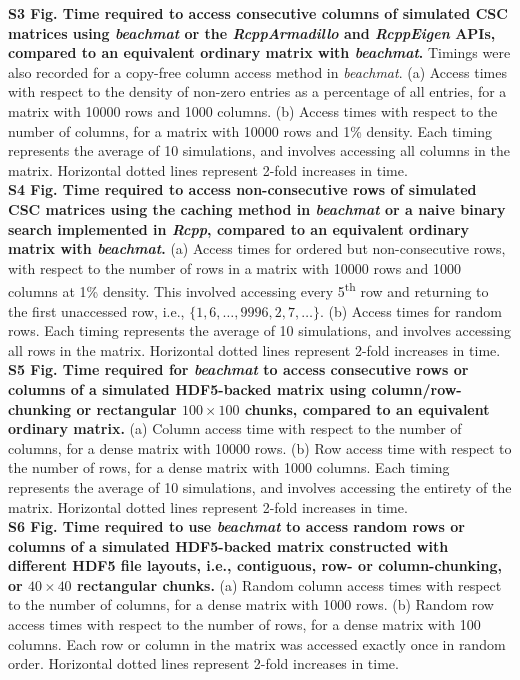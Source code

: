 \documentclass[10pt,letterpaper]{article}
\newcommand{\beachmat}{\textit{beachmat}}
\begin{document}
\noindent
\textbf{S3 Fig. Time required to access consecutive columns of simulated CSC matrices using \beachmat{} or the \textit{RcppArmadillo} and \textit{RcppEigen} APIs, compared to an equivalent ordinary matrix with \beachmat{}.}
Timings were also recorded for a copy-free column access method in \beachmat{}.
(a) Access times with respect to the density of non-zero entries as a percentage of all entries, for a matrix with 10000 rows and 1000 columns.
(b) Access times with respect to the number of columns, for a matrix with 10000 rows and 1\% density.
Each timing represents the average of 10 simulations, and involves accessing all columns in the matrix.
Horizontal dotted lines represent 2-fold increases in time.
\\[0.05in]

\noindent
\textbf{S4 Fig. Time required to access non-consecutive rows of simulated CSC matrices using the caching method in \beachmat{} or a naive binary search implemented in \textit{Rcpp}, compared to an equivalent ordinary matrix with \beachmat{}.}
(a) Access times for ordered but non-consecutive rows, with respect to the number of rows in a matrix with 10000 rows and 1000 columns at 1\% density.
This involved accessing every 5\textsuperscript{th} row and returning to the first unaccessed row, i.e., $\{1, 6, \ldots, 9996, 2, 7, \ldots\}$.
(b) Access times for random rows.
Each timing represents the average of 10 simulations, and involves accessing all rows in the matrix.
Horizontal dotted lines represent 2-fold increases in time.
\\[0.05in]

\noindent
\textbf{S5 Fig. Time required for \beachmat{} to access consecutive rows or columns of a simulated HDF5-backed matrix using column/row-chunking or rectangular $100\times100$ chunks, compared to an equivalent ordinary matrix.}
(a) Column access time with respect to the number of columns, for a dense matrix with 10000 rows.
(b) Row access time with respect to the number of rows, for a dense matrix with 1000 columns.
Each timing represents the average of 10 simulations, and involves accessing the entirety of the matrix.
Horizontal dotted lines represent 2-fold increases in time.
\\[0.05in]

\noindent
\textbf{S6 Fig. Time required to use \beachmat{} to access random rows or columns of a simulated HDF5-backed matrix constructed with different HDF5 file layouts, 
i.e., contiguous, row- or column-chunking, or $40\times40$ rectangular chunks.}
(a) Random column access times with respect to the number of columns, for a dense matrix with 1000 rows.
(b) Random row access times with respect to the number of rows, for a dense matrix with 100 columns.
Each row or column in the matrix was accessed exactly once in random order.
Horizontal dotted lines represent 2-fold increases in time.
\\[0.05in]
\end{document}
